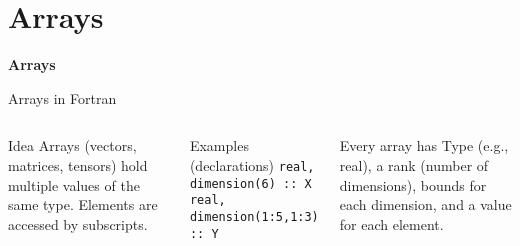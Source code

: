 \section{Arrays}

\begin{frame}
	\centering
	\Huge \textbf{Arrays}
\end{frame}


\begin{frame}[fragile]{Arrays in Fortran}
  \begin{columns}[T]

    \begin{block}{Idea}
      Arrays (vectors, matrices, tensors) hold multiple values of the same type.
      Elements are accessed by subscripts.
    \end{block}

    \begin{block}{Examples (declarations)}
      \texttt{real, dimension(6) :: X}\\
      \texttt{real, dimension(1:5,1:3) :: Y}
    \end{block}

    \begin{block}{Every array has}
      Type (e.g., real), a rank (number of dimensions), bounds for each dimension,
      and a value for each element.
    \end{block}


    \vspace{0.8cm}


  \end{columns}
\end{frame}



